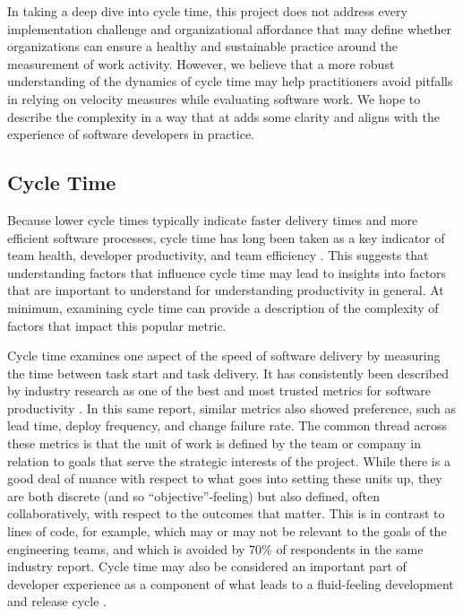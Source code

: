 \documentclass[
  sn-mathphys-ay,
]{sn-jnl}
\begin{document}
In taking a deep dive into cycle time, this project does not address
every implementation challenge and organizational affordance that may
define whether organizations can ensure a healthy and sustainable
practice around the measurement of work activity. However, we believe
that a more robust understanding of the dynamics of cycle time may help
practitioners avoid pitfalls in relying on velocity measures while
evaluating software work. We hope to describe the complexity in a way
that at adds some clarity and aligns with the experience of software
developers in practice.

\subsection{Cycle Time}\label{cycle-time}

Because lower cycle times typically indicate faster delivery times and
more efficient software processes, cycle time has long been taken as a
key indicator of team health, developer productivity, and team
efficiency
\citep{clincySoftwareDevelopmentProductivity2003, agrawalSoftwareEffortQuality2007, carmelCycleTimePackaged1995, eversImprovingEngineeringProductivity1998, guptaKeyDriversReduced1998, nanImpactBudgetSchedule2009, ruvimovaExploratoryStudyProductivity2022, sadowskiRethinkingProductivitySoftware2019, trendowiczChapter6Factors2009}.
This suggests that understanding factors that influence cycle time may
lead to insights into factors that are important to understand for
understanding productivity in general. At minimum, examining cycle time
can provide a description of the complexity of factors that impact this
popular metric.

Cycle time examines one aspect of the speed of software delivery by
measuring the time between task start and task delivery. It has
consistently been described by industry research as one of the best and
most trusted metrics for software productivity
\citep{careyWhy70Engineers2024}. In this same report, similar metrics
also showed preference, such as lead time, deploy frequency, and change
failure rate. The common thread across these metrics is that the unit of
work is defined by the team or company in relation to goals that serve
the strategic interests of the project. While there is a good deal of
nuance with respect to what goes into setting these units up, they are
both discrete (and so ``objective''-feeling) but also defined, often
collaboratively, with respect to the outcomes that matter. This is in
contrast to lines of code, for example, which may or may not be relevant
to the goals of the engineering teams, and which is avoided by 70\% of
respondents in the same industry report. Cycle time may also be
considered an important part of developer experience as a component of
what leads to a fluid-feeling development and release cycle
\citep{greilerActionableFrameworkUnderstanding2022a}.
\end{document}
